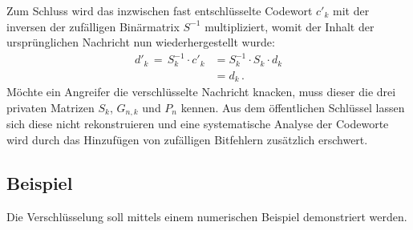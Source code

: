 Zum Schluss wird das inzwischen fast entschlüsselte Codewort $c'_k$ mit der inversen der zufälligen Binärmatrix $S^{-1}$ multipliziert,
womit der Inhalt der ursprünglichen Nachricht nun wiederhergestellt wurde:
\begin{align*}
    d'_{k}\,=\,S_{k}^{-1} \cdot c'_k&=S_{k}^{-1} \cdot S_{k}\cdot d_k\\
                                    &=d_k\,.
\end{align*}
Möchte ein Angreifer die verschlüsselte Nachricht knacken, muss dieser die drei privaten Matrizen $S_k$, $G_{n,k}$ und $P_n$ kennen.
Aus dem öffentlichen Schlüssel lassen sich diese nicht rekonstruieren
und eine systematische Analyse der Codeworte wird durch das Hinzufügen von zufälligen Bitfehlern zusätzlich erschwert.

\subsection{Beispiel}
Die Verschlüsselung soll mittels einem numerischen Beispiel demonstriert werden.
